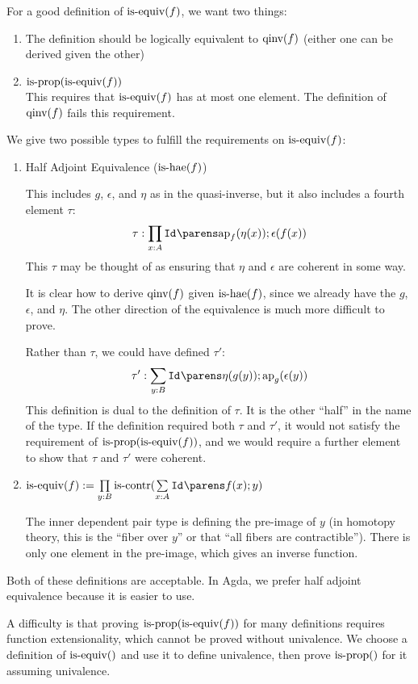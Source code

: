 \documentclass[11pt]{article}
\newcommand{\isequiv}[1]{\ensuremath{\textnormal{is-equiv}(#1)}}
\newcommand{\qinv}[1]{\ensuremath{\textnormal{qinv}(#1)}}
\newcommand{\isprop}[1]{\ensuremath{\textnormal{is-prop}(#1)}}
\newcommand{\iscontr}[1]{\ensuremath{\textnormal{is-contr}(#1)}}
\newcommand{\ishae}[1]{\ensuremath{\textnormal{is-hae}(#1)}}
\newcommand{\ap}{\textnormal{ap}}
\begin{document}
For a good definition of $\isequiv{f}$, we want two things:
\begin{enumerate}
\item The definition should be logically equivalent to $\qinv{f}$
  (either one can be derived given the other)
\item $\isprop{\isequiv{f}}$ \\
  This requires that $\isequiv{f}$ has at most one element.  The
  definition of $\qinv{f}$ fails this requirement.
\end{enumerate}

We give two possible types to fulfill the requirements on
$\isequiv{f}$:
\begin{enumerate}
\item Half Adjoint Equivalence ($\ishae{f}$)

  This includes $g$, $\epsilon$, and $\eta$ as in the quasi-inverse,
  but it also includes a fourth element $\tau$:
  \[\oftype{\tau}{\dfuntype{x}{A}{\idtype{}{\ap_f(\eta(x))}{\epsilon(f(x))}}}\]
  This $\tau$ may be thought of as ensuring that $\eta$ and $\epsilon$
  are coherent in some way.

  It is clear how to derive $\qinv{f}$ given $\ishae{f}$, since we
  already have the $g$, $\epsilon$, and $\eta$.  The other direction
  of the equivalence is much more difficult to prove.

  Rather than $\tau$, we could have defined $\tau'$:
  \[\oftype{\tau'}{\dpairtype{y}{B}{\idtype{}{\eta(g(y))}{\ap_g(\epsilon(y))}}}\]
  This definition is dual to the definition of $\tau$.  It is the
  other ``half'' in the name of the type.
  If the definition required both $\tau$ and $\tau'$, it would not
  satisfy the requirement of $\isprop{\isequiv{f}}$, and we would
  require a further element to show that $\tau$ and $\tau'$ were
  coherent.

\item $\isequiv{f} := \dfuntype{y}{B}{\iscontr{\dpairtype{x}{A}{\idtype{}{f(x)}{y}}}}$

  The inner dependent pair type is defining the pre-image of $y$ (in
  homotopy theory, this is the ``fiber over $y$'' or that ``all fibers
  are contractible'').  There is only one element in the pre-image,
  which gives an inverse function.
\end{enumerate}
Both of these definitions are acceptable.  In Agda, we prefer half
adjoint equivalence because it is easier to use.

A difficulty is that proving $\isprop{\isequiv{f}}$ for many
definitions requires function extensionality, which cannot be proved
without univalence.  We choose a definition of $\isequiv$ and use it
to define univalence, then prove $\isprop$ for it assuming univalence.
\end{document}
